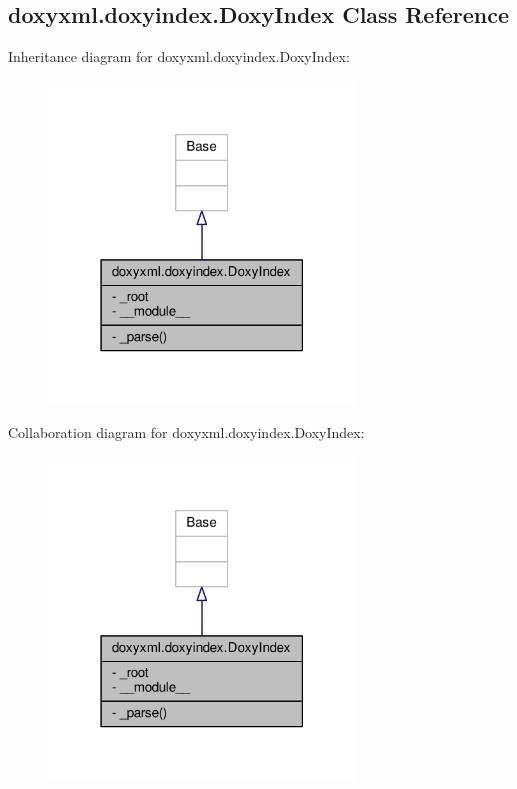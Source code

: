 \subsection{doxyxml.\+doxyindex.\+Doxy\+Index Class Reference}
\label{classdoxyxml_1_1doxyindex_1_1DoxyIndex}


Inheritance diagram for doxyxml.\+doxyindex.\+Doxy\+Index\+:
\nopagebreak
\begin{figure}[H]
\begin{center}
\leavevmode
\includegraphics[width=231pt]{dc/df8/classdoxyxml_1_1doxyindex_1_1DoxyIndex__inherit__graph}
\end{center}
\end{figure}


Collaboration diagram for doxyxml.\+doxyindex.\+Doxy\+Index\+:
\nopagebreak
\begin{figure}[H]
\begin{center}
\leavevmode
\includegraphics[width=231pt]{dd/de4/classdoxyxml_1_1doxyindex_1_1DoxyIndex__coll__graph}
\end{center}
\end{figure}

